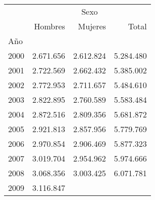 \begin{tabular}{llll}
\cline{1-4}
\multicolumn{1}{c}{} &
  \multicolumn{3}{|c}{Sexo} \\
\multicolumn{1}{c}{} &
  \multicolumn{1}{|r}{Hombres} &
  \multicolumn{1}{r}{Mujeres} &
  \multicolumn{1}{r}{Total} \\
\cline{1-4}
\multicolumn{1}{l}{Año} &
  \multicolumn{1}{|r}{} &
  \multicolumn{1}{r}{} &
  \multicolumn{1}{r}{} \\
\multicolumn{1}{l}{\hspace{1em}2000} &
  \multicolumn{1}{|r}{2.671.656} &
  \multicolumn{1}{r}{2.612.824} &
  \multicolumn{1}{r}{5.284.480} \\
\multicolumn{1}{l}{\hspace{1em}2001} &
  \multicolumn{1}{|r}{2.722.569} &
  \multicolumn{1}{r}{2.662.432} &
  \multicolumn{1}{r}{5.385.002} \\
\multicolumn{1}{l}{\hspace{1em}2002} &
  \multicolumn{1}{|r}{2.772.953} &
  \multicolumn{1}{r}{2.711.657} &
  \multicolumn{1}{r}{5.484.610} \\
\multicolumn{1}{l}{\hspace{1em}2003} &
  \multicolumn{1}{|r}{2.822.895} &
  \multicolumn{1}{r}{2.760.589} &
  \multicolumn{1}{r}{5.583.484} \\
\multicolumn{1}{l}{\hspace{1em}2004} &
  \multicolumn{1}{|r}{2.872.516} &
  \multicolumn{1}{r}{2.809.356} &
  \multicolumn{1}{r}{5.681.872} \\
\multicolumn{1}{l}{\hspace{1em}2005} &
  \multicolumn{1}{|r}{2.921.813} &
  \multicolumn{1}{r}{2.857.956} &
  \multicolumn{1}{r}{5.779.769} \\
\multicolumn{1}{l}{\hspace{1em}2006} &
  \multicolumn{1}{|r}{2.970.854} &
  \multicolumn{1}{r}{2.906.469} &
  \multicolumn{1}{r}{5.877.323} \\
\multicolumn{1}{l}{\hspace{1em}2007} &
  \multicolumn{1}{|r}{3.019.704} &
  \multicolumn{1}{r}{2.954.962} &
  \multicolumn{1}{r}{5.974.666} \\
\multicolumn{1}{l}{\hspace{1em}2008} &
  \multicolumn{1}{|r}{3.068.356} &
  \multicolumn{1}{r}{3.003.425} &
  \multicolumn{1}{r}{6.071.781} \\
\multicolumn{1}{l}{\hspace{1em}2009} &
  \multicolumn{1}{|r}{3.116.847} &

\end{tabular}
